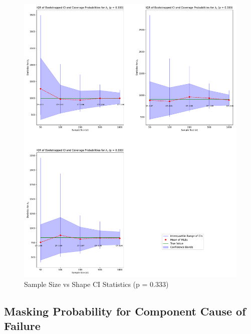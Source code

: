 \documentclass[
]{article}
\begin{document}
\begin{figure}

{\centering \includegraphics{image/plot-n-vs-stats-p333-scale} 

}

\caption{Sample Size vs Shape CI Statistics (p = 0.333)}\label{fig:samp-size-n-vs-stats-p215-scale}
\end{figure}

\hypertarget{sec:p-vs-mttf}{%
\subsection{Masking Probability for Component Cause of
Failure}\label{sec:p-vs-mttf}}
\end{document}
